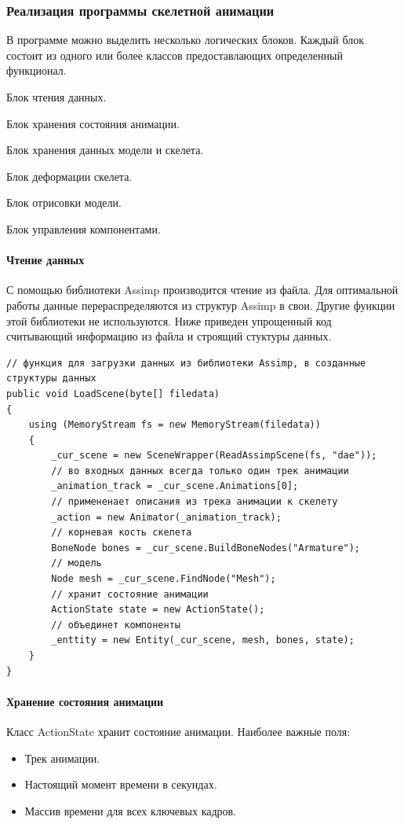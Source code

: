 \subsubsection{Реализация программы скелетной анимации}
В программе можно выделить несколько логических блоков. Каждый блок состоит из одного или более классов предоставлающих определенный функционал.

\begin{my_enumerate}
\item Блок чтения данных.
\item Блок хранения состояния анимации.
\item Блок хранения данных модели и скелета.
\item Блок деформации скелета.
\item Блок отрисовки модели.
\item Блок управления компонентами.
\end{my_enumerate}

\paragraph{Чтение данных}
С помощью библиотеки Assimp производится чтение из файла. Для оптимальной работы данные перераспределяются из структур Assimp в свои. Другие функции этой библиотеки не используются.
Ниже приведен упрощенный код считывающий информацию из файла и строящий стуктуры данных.

\begin{verbatim}
// функция для загрузки данных из библиотеки Assimp, в созданные структуры данных
public void LoadScene(byte[] filedata)
{
    using (MemoryStream fs = new MemoryStream(filedata))
    {
        _cur_scene = new SceneWrapper(ReadAssimpScene(fs, "dae"));
        // во входных данных всегда только один трек анимации
        _animation_track = _cur_scene.Animations[0];
        // примененает описания из трека анимации к скелету
        _action = new Animator(_animation_track);
        // корневая кость скелета
        BoneNode bones = _cur_scene.BuildBoneNodes("Armature");
        // модель
        Node mesh = _cur_scene.FindNode("Mesh");
        // хранит состояние анимации
        ActionState state = new ActionState();
        // объединет компоненты
        _enttity = new Entity(_cur_scene, mesh, bones, state);
    }
}
\end{verbatim}


\paragraph{Хранение состояния анимации}
Класс ActionState хранит состояние анимации. Наиболее важные поля:
\begin{itemize}
\item Трек анимации.
\item Настоящий момент времени в секундах.
\item Массив времени для всех ключевых кадров.
\end{itemize}

